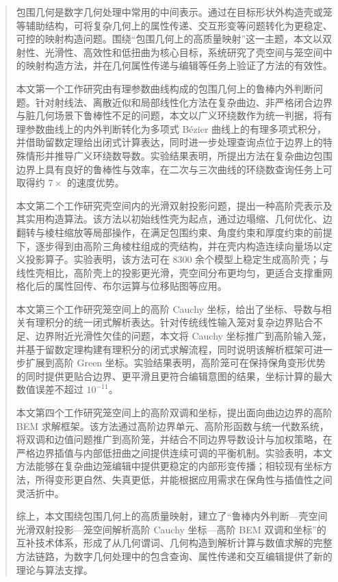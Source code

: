

\begin{abstract}
包围几何是数字几何处理中常用的中间表示。通过在目标形状外构造壳或笼等辅助结构，可将复杂几何上的属性传递、交互形变等问题转化为更稳定、可控的映射构造问题。围绕“包围几何上的高质量映射”这一主题，本文以双射性、光滑性、高效性和低扭曲为核心目标，系统研究了壳空间与笼空间中的映射构造方法，并在几何属性传递与编辑等任务上验证了方法的有效性。

本文第一个工作研究由有理参数曲线构成的包围几何上的鲁棒内外判断问题。针对射线法、离散近似和局部线性化方法在复杂曲边、非严格闭合边界与脏几何场景下鲁棒性不足的问题，本文以广义环绕数作为统一判据，将有理参数曲线上的内外判断转化为多项式 B\'{e}zier 曲线上的有理多项式积分，并借助留数定理给出闭式计算表达，同时进一步处理查询点位于边界上的特殊情形并推导广义环绕数导数。实验结果表明，所提出方法在复杂曲边包围边界上具有良好的鲁棒性与效率，在二次与三次曲线的环绕数查询任务上可取得约 $7\times$ 的速度优势。

本文第二个工作研究壳空间内的光滑双射投影问题，提出一种高阶壳表示及其实用构造算法。该方法以初始线性壳为起点，通过边塌缩、几何优化、边翻转与棱柱缩放等局部操作，在满足包围约束、角度约束和厚度约束的前提下，逐步得到由高阶三角棱柱组成的壳结构，并在壳内构造连续向量场以定义投影算子。实验表明，该方法可在 8300 余个模型上稳定生成高阶壳；与线性壳相比，高阶壳上的投影更光滑，壳空间分布更均匀，更适合支撑重网格化后的属性回传、布尔运算与位移贴图等应用。

本文第三个工作研究笼空间上的高阶 Cauchy 坐标，给出了坐标、导数与相关有理积分的统一闭式解析表达。针对传统线性输入笼对复杂边界贴合不足、边界附近光滑性欠佳的问题，本文将 Cauchy 坐标推广到高阶输入笼，并基于留数定理构建有理积分的闭式求解流程，同时说明该解析框架可进一步扩展到高阶 Green 坐标。实验结果表明，高阶笼可在保持保角变形优势的同时提供更贴合边界、更平滑且更符合编辑意图的结果，坐标计算的最大数值误差不超过 $10^{-11}$。

本文第四个工作研究笼空间上的高阶双调和坐标，提出面向曲边边界的高阶 BEM 求解框架。该方法通过高阶边界单元、高阶形函数与统一代数系统，将双调和边值问题推广到高阶笼，并结合不同边界导数设计与加权策略，在严格边界插值与内部低扭曲之间提供连续可调的平衡机制。实验表明，本文方法能够在复杂曲边笼编辑中提供更稳定的内部形变传播；相较现有坐标方法，所得变形更自然、失真更低，并能根据应用需求在保角性与插值性之间灵活折中。

综上，本文围绕包围几何上的高质量映射，建立了“鲁棒内外判断---壳空间光滑双射投影---笼空间解析高阶 Cauchy 坐标---高阶 BEM 双调和坐标”的互补技术体系，形成了从几何谓词、几何构造到解析计算与数值求解的完整方法链路，为数字几何处理中的包含查询、属性传递和交互编辑提供了新的理论与算法支撑。
\end{abstract}

